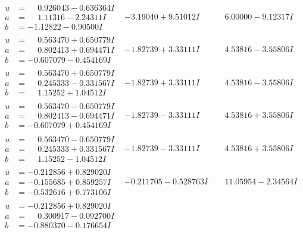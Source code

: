 \documentclass[1p]{elsarticle_modified}
\theoremstyle{definition}
\begin{document}
$$\begin{array}{c|c|c}
\begin{aligned}
u &= \phantom{-}0.926043 - 0.636364 I \\
a &= \phantom{-}1.11316 - 2.24311 I \\
b &= -1.12822 - 0.90500 I\end{aligned}
 & -3.19040 + 9.51012 I & \phantom{-}6.00000 - 9.12317 I \\ \hline\begin{aligned}
u &= \phantom{-}0.563470 + 0.650779 I \\
a &= \phantom{-}0.802413 + 0.694471 I \\
b &= -0.607079 - 0.454169 I\end{aligned}
 & -1.82739 + 3.33111 I & \phantom{-}4.53816 - 3.55806 I \\ \hline\begin{aligned}
u &= \phantom{-}0.563470 + 0.650779 I \\
a &= \phantom{-}0.245333 - 0.331567 I \\
b &= \phantom{-}1.15252 + 1.04512 I\end{aligned}
 & -1.82739 + 3.33111 I & \phantom{-}4.53816 - 3.55806 I \\ \hline\begin{aligned}
u &= \phantom{-}0.563470 - 0.650779 I \\
a &= \phantom{-}0.802413 - 0.694471 I \\
b &= -0.607079 + 0.454169 I\end{aligned}
 & -1.82739 - 3.33111 I & \phantom{-}4.53816 + 3.55806 I \\ \hline\begin{aligned}
u &= \phantom{-}0.563470 - 0.650779 I \\
a &= \phantom{-}0.245333 + 0.331567 I \\
b &= \phantom{-}1.15252 - 1.04512 I\end{aligned}
 & -1.82739 - 3.33111 I & \phantom{-}4.53816 + 3.55806 I \\ \hline\begin{aligned}
u &= -0.212856 + 0.829020 I \\
a &= -0.155685 + 0.859257 I \\
b &= -0.532616 + 0.773106 I\end{aligned}
 & -0.211705 - 0.528763 I & \phantom{-}11.05954 - 2.34564 I \\ \hline\begin{aligned}
u &= -0.212856 + 0.829020 I \\
a &= \phantom{-}0.300917 - 0.092700 I \\
b &= -0.880370 - 0.176654 I\end{aligned}

\end{array}$$
\end{document}
